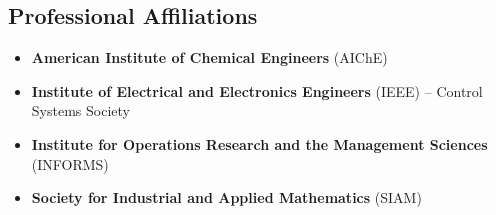 \documentclass[letterpaper, 11pt]{article}
\begin{document}

\subsection*{Professional Affiliations}
\begin{itemize}[label=$\bullet$,itemsep=0pt]
\item {\bf American Institute of Chemical Engineers} (AIChE)
\item {\bf Institute of Electrical and Electronics Engineers} (IEEE) -- Control Systems Society
\item {\bf Institute for Operations Research and the Management Sciences} (INFORMS)
\item {\bf Society for Industrial and Applied Mathematics} (SIAM)
\end{itemize}
\let\OLDthebibliography\thebibliography
\renewcommand\thebibliography[1]{
  \OLDthebibliography{#1}
  \setlength{\parskip}{0pt}
  \setlength{\itemsep}{0pt}
}
\end{document}
